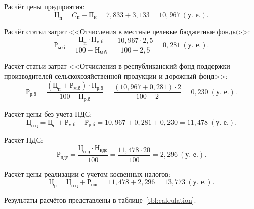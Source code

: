 Расчёт цены предприятия:
\begin{equation*}
\text{Ц}_{\text{п}} = 
C_{\text{п}} + \text{П}_{\text{н}} =
7{,}833 + 3{,}133 =
10{,}967 \: (\text{у.~е.}).
\end{equation*}

Расчёт статьи затрат 
<<Отчисления в местные целевые бюджетные фонды>>:
\begin{equation*}
\text{Р}_{\text{м.б}} = 
\dfrac{
  \text{Ц}_{\text{п}} \cdot \text{Н}_{\text{м.б}}
}{
  100 - \text{Н}_{\text{м.б}}
} =
\dfrac{10{,}967 \cdot 2{,}5 }{100 - 2{,}5}  =
0{,}281 \: (\text{у.~е.}).
\end{equation*}

Расчёт статьи затрат 
<<Отчисления в республиканский фонд поддержки производителей
сельскохозяйственной продукции и дорожный фонд>>:
\begin{equation*}
\text{Р}_{\text{р.б}} = 
\dfrac{
  (\text{Ц}_{\text{п}} + \text{Р}_{\text{м.б}}) \cdot \text{Н}_{\text{р.б}}
}{
  100 - \text{Н}_{\text{р.б}}
} =
\dfrac{(10{,}967 + 0{,}281) \cdot 2}{100 - 2} =
0{,}230 \: (\text{у.~е.}).
\end{equation*}

Расчёт цены без учета НДС:
\begin{equation*}
\text{Ц}_{\text{о.ц}} = 
\text{Ц}_{\text{п}} + \text{Р}_{\text{м.б}} + \text{Р}_{\text{р.б}} = 
10{,}967 + 0{,}281 + 0{,}230 =
11{,}478 \: (\text{у.~е.}).
\end{equation*}

Расчёт НДС:
\begin{equation*}
\text{Р}_{\text{ндс}} = 
\dfrac{
  \text{Ц}_{\text{о.ц}} \cdot \text{Н}_{\text{ндс}}
}{
  100
} =
\dfrac{11{,}478 \cdot 20}{100}  =
2{,}296 \: (\text{у.~е.}).
\end{equation*}

Расчёт цены реализации с учетом косвенных налогов:
\begin{equation*}
\text{Ц}_{\text{р}} = 
\text{Ц}_{\text{о.ц}} + \text{Р}_{\text{ндс}} =
11{,}478 + 2{,}296 = 
13{,}773 \: (\text{у.~е.}).
\end{equation*}

Результаты расчётов представлены в таблице~\ref{tbl:calculation}.

